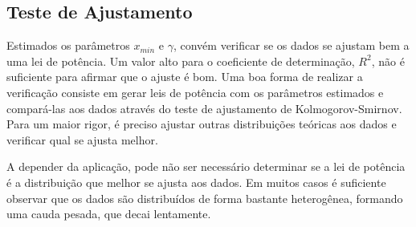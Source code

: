 \documentclass{article}
\begin{document}
\subsection{Teste de Ajustamento}

Estimados os parâmetros $x_{min}$ e $\gamma$, convém verificar se os dados se ajustam bem a uma lei de potência. Um valor alto para o coeficiente de determinação, $R^2$, não é suficiente para afirmar que o ajuste é bom. Uma boa forma de realizar a verificação consiste em gerar leis de potência com os parâmetros estimados e compará-las aos dados através do teste de ajustamento de Kolmogorov-Smirnov. Para um maior rigor, é preciso ajustar outras distribuições teóricas aos dados e verificar qual se ajusta melhor.

A depender da aplicação, pode não ser necessário determinar se 
a lei de potência é a distribuição que melhor se ajusta aos dados. Em muitos casos é suficiente observar que os dados são distribuídos de forma bastante heterogênea, formando uma cauda pesada, que decai lentamente. 





% 
% 
% 
% 
% 
% 
% 
% 
\end{document}
